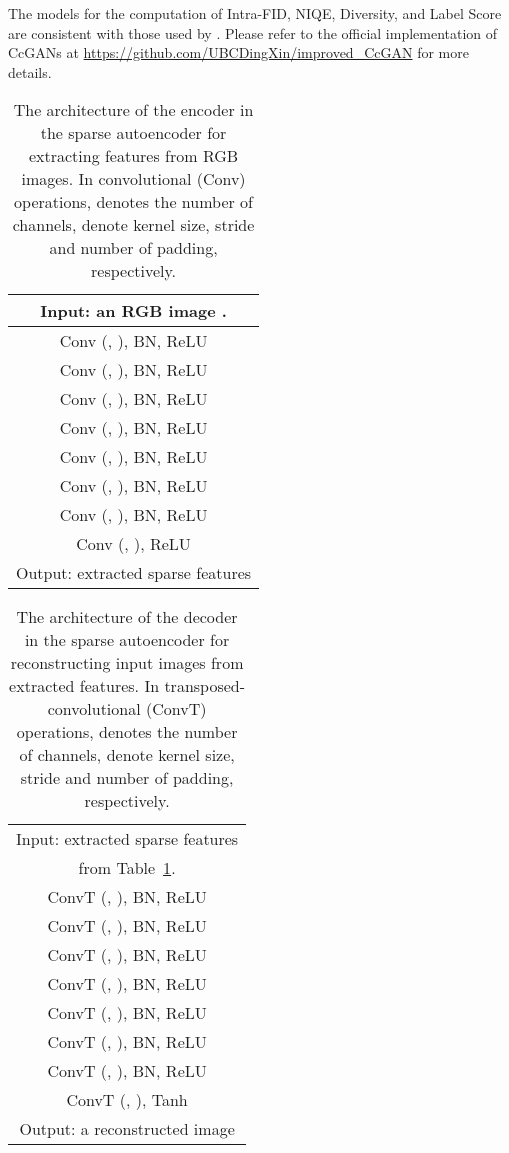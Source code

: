 \documentclass[10pt, twocolumn]{article}
\theoremstyle{definition}
\begin{document}
The models for the computation of Intra-FID, NIQE, Diversity, and Label Score are consistent with those used by \cite{ding2021ccgan, ding2020continuous}. Please refer to the official implementation of CcGANs at \url{https://github.com/UBCDingXin/improved_CcGAN} for more details.




\begin{table}[!htbp]
	\centering
	\caption{The architecture of the encoder in the sparse autoencoder for extracting features from  RGB images. In convolutional (Conv) operations,  denotes the number of channels,  denote kernel size, stride and number of padding, respectively. }
	\begin{tabular}{c}
		\toprule
		Input: an RGB image . \\ 
		\hline
		Conv (, ), BN, ReLU \\\hline
		Conv (, ), BN, ReLU \\\hline
		Conv (, ), BN, ReLU \\\hline
		Conv (, ), BN, ReLU \\\hline
		Conv (, ), BN, ReLU \\\hline
		Conv (, ), BN, ReLU \\\hline
		Conv (, ), BN, ReLU
		\\\hline
		Conv (, ), ReLU
		\\ \hline
		Output: extracted sparse features 
		\\ \bottomrule
	\end{tabular}\label{tab:RC49_SparseAE_encoder}\end{table}

\begin{table}[!htbp]
	\centering
	\caption{The architecture of the decoder in the sparse autoencoder for reconstructing  input images from extracted features. In transposed-convolutional (ConvT) operations,  denotes the number of channels,  denote kernel size, stride and number of padding, respectively. }
	\begin{tabular}{c}
		\toprule
		Input: extracted sparse features  
		\\ from Table~\ref{tab:RC49_SparseAE_encoder}. \\
		\hline
		ConvT (, ), BN, ReLU \\\hline
		ConvT (, ), BN, ReLU \\\hline
		ConvT (, ), BN, ReLU \\\hline
		ConvT (, ), BN, ReLU \\\hline
		ConvT (, ), BN, ReLU \\\hline
		ConvT (, ), BN, ReLU \\\hline
		ConvT (, ), BN, ReLU
		\\\hline
		ConvT (, ), Tanh
		\\ \hline
		Output: a reconstructed image 
		\\ \bottomrule
	\end{tabular}\label{tab:RC49_SparseAE_decoder}\end{table}
\end{document}
